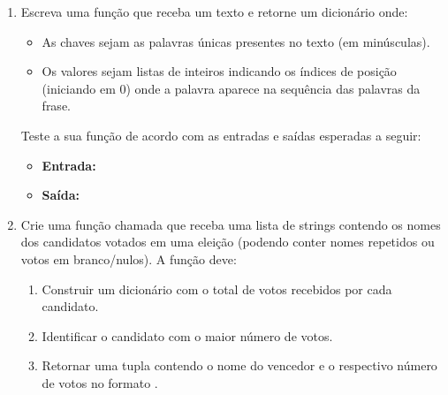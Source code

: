 \begin{enumerate}[label=\textbf{Q\arabic*.}]
\begin{itemize}
    \item \textbf{Entrada:} A lista  fornecida.
    \item \textbf{Saída:} 
    \begin{verbatim}
[
    {'nome': 'Carlos', 
    'email': 'carlos@email.com', 
    'cpf': '123.456.789-00', 
    'ativo': True},
    {'nome': 'Mariana', 
    'email': 'mariana@email.com', 
    'ativo': False},
    {'nome': 'Pedro', 
    'email': 'pedro@email.com', 
    'cpf': '456.789.123-22', 
    'ativo': True}
]
    \end{verbatim}
\end{itemize}




\item Escreva uma função  que receba um texto e retorne um dicionário onde:
\begin{itemize}
    \item As chaves sejam as palavras únicas presentes no texto (em minúsculas).
    \item Os valores sejam listas de inteiros indicando os índices de posição (iniciando em 0) onde a palavra aparece na sequência das palavras da frase.
\end{itemize}
Teste a sua função de acordo com as entradas e saídas esperadas a seguir:
\begin{itemize}
    \item \textbf{Entrada:} 
    \item \textbf{Saída:} \\
\end{itemize}




\item Crie uma função chamada  que receba uma lista de strings contendo os nomes dos candidatos votados em uma eleição (podendo conter nomes repetidos ou votos em branco/nulos). A função deve:
\begin{enumerate}[label=\alph*)]
    \item Construir um dicionário com o total de votos recebidos por cada candidato.
    \item Identificar o candidato com o maior número de votos.
    \item Retornar uma tupla contendo o nome do vencedor e o respectivo número de votos no formato .
\end{enumerate}


\end{enumerate}
